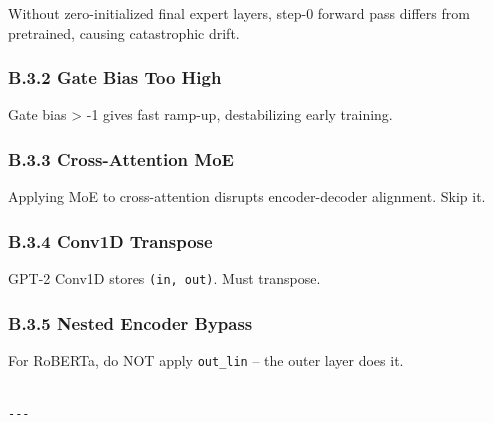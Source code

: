 Without zero-initialized final expert layers, step-0 forward pass differs 
from pretrained, causing catastrophic drift.

\subsubsection{B.3.2 Gate Bias Too High}

Gate bias \textgreater{} -1 gives fast ramp-up, destabilizing early training.

\subsubsection{B.3.3 Cross-Attention MoE}

Applying MoE to cross-attention disrupts encoder-decoder alignment. Skip it.

\subsubsection{B.3.4 Conv1D Transpose}

GPT-2 Conv1D stores \texttt{(in, out)}. Must transpose.

\subsubsection{B.3.5 Nested Encoder Bypass}

For RoBERTa, do NOT apply \texttt{out\_lin} -- the outer layer does it.
\begin{lstlisting}

---
\end{lstlisting}